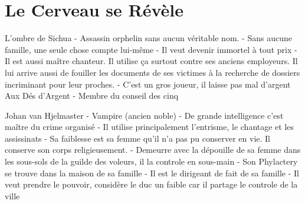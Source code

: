 \section{Le Cerveau se Révèle}

L'ombre de Sichua
 - Assassin orphelin sans aucun véritable nom.
 - Sans aucune famille, une seule chose compte lui-même
 - Il veut devenir immortel à tout prix
 - Il est aussi maître chanteur. Il utilise ça surtout contre ses anciens
   employeurs. Il lui arrive aussi de fouiller les documents de ses
   victimes à la recherche de dossiers incriminant pour leur proches.
 - C'est un gros joueur, il laisse pas mal d'argent Aux Dés d'Argent
 - Membre du conseil des cinq


Johan van Hjelmaster
 - Vampire (ancien noble)
 - De grande intelligence c'est maître du crime organisé
 - Il utilise principalement l'entrisme, le chantage et les assissinats
 - Sa faiblesse est sa femme qu'il n'a pas pu conserver en vie. Il conserve son corps religieusement.
 - Demeurre avec la dépouille de sa femme dans les sous-sols de la guilde des voleurs, il la controle 
   en sous-main
 - Son Phylactery se trouve dans la maison de sa famille
 - Il est le dirigeant de fait de sa famille
 - Il veut prendre le pouvoir, considère le duc un faible car il partage le controle de la ville


